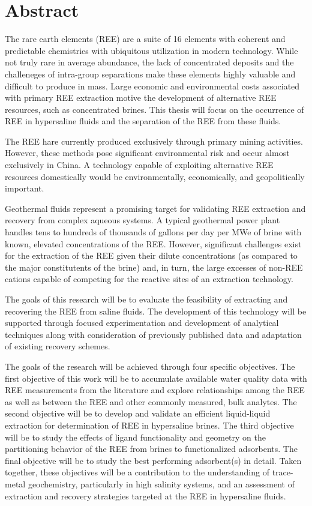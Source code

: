 \chapter{Abstract}
The rare earth elements (REE) are a suite of 16 elements with coherent and predictable chemistries with ubiquitous utilization in modern technology.
While not truly rare in average abundance, the lack of concentrated deposits and the challeneges of intra-group separations make these elements highly valuable and difficult to produce in mass.
Large economic and environmental costs associated with primary REE extraction motive the development of alternative REE resources, such as concentrated brines.
This thesis will focus on the occurrence of REE in hypersaline fluids and the separation of the REE from these fluids.

The REE hare currently produced exclusively through primary mining activities.
However, these methods pose significant environmental risk and occur almost exclusively in China.
A technology capable of exploiting alternative REE resources domestically would be environmentally, economically, and geopolitically important.

Geothermal fluids represent a promising target for validating REE extraction and recovery from complex aqueous systems.
A typical geothermal power plant handles tens to hundreds of thousands of gallons per day per MWe of brine with known, elevated concentrations of the REE.
However, significant challenges exist for the extraction of the REE given their dilute concentrations (as compared to the major constitutents of the brine) and, in turn, the large excesses of non-REE cations capable of competing for the reactive sites of an extraction technology.

The goals of this research will be to evaluate the feasibility of extracting and recovering the REE from saline fluids.
The development of this technology will be supported through focused experimentation and development of analytical techniques along with consideration of previously published data and adaptation of existing recovery schemes.

The goals of the research will be achieved through four specific objectives.
The first objective of this work will be to accumulate available water quality data with REE measurements from the literature and explore relationships among the REE as well as between the REE and other commonly measured, bulk analytes.
The second objective will be to develop and validate an efficient liquid-liquid extraction for determination of REE in hypersaline brines.
The third objective will be to study the effects of ligand functionality and geometry on the partitioning behavior of the REE from brines to functionalized adsorbents.
The final objective will be to study the best performing adsorbent(s) in detail.
Taken together, these objectives will be a contribution to the understanding of trace-metal geochemistry, particularly in high salinity systems, and an assessment of extraction and recovery strategies targeted at the REE in hypersaline fluids.
